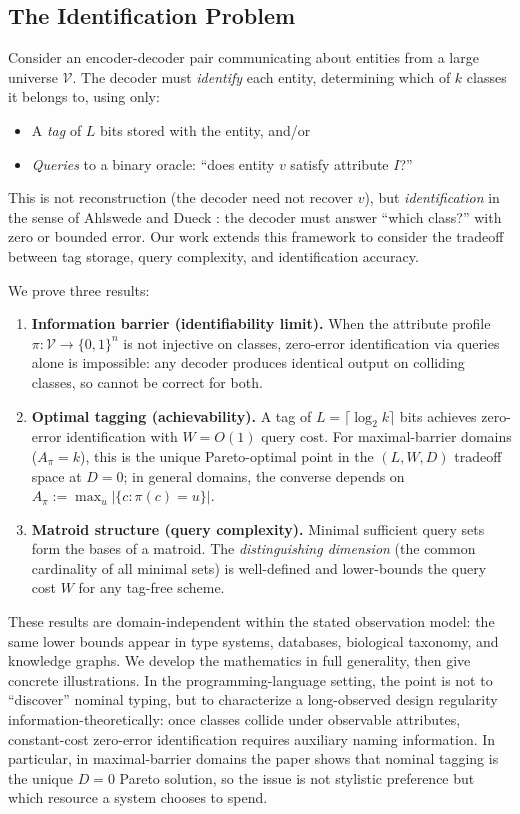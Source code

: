 \subsection{The Identification Problem}

Consider an encoder-decoder pair communicating about entities from a large universe $\mathcal{V}$. The decoder must \emph{identify} each entity, determining which of $k$ classes it belongs to, using only:
\begin{itemize}
\item A \emph{tag} of $L$ bits stored with the entity, and/or
\item \emph{Queries} to a binary oracle: ``does entity $v$ satisfy attribute $I$?''
\end{itemize}

This is not reconstruction (the decoder need not recover $v$), but \emph{identification} in the sense of Ahlswede and Dueck \cite{ahlswede1989identification}: the decoder must answer ``which class?'' with zero or bounded error. Our work extends this framework to consider the tradeoff between tag storage, query complexity, and identification accuracy.

We prove three results:
\begin{enumerate}
\item \textbf{Information barrier (identifiability limit).} When the attribute profile $\pi: \mathcal{V} \to \{0,1\}^n$ is not injective on classes, zero-error identification via queries alone is impossible: any decoder produces identical output on colliding classes, so cannot be correct for both.
\item \textbf{Optimal tagging (achievability).} A tag of $L = \lceil \log_2 k \rceil$ bits achieves zero-error identification with $W = O(1)$ query cost. For maximal-barrier domains ($A_\pi = k$), this is the unique Pareto-optimal point in the $(L, W, D)$ tradeoff space at $D=0$; in general domains, the converse depends on $A_\pi := \max_u |\{c : \pi(c)=u\}|$.
\item \textbf{Matroid structure (query complexity).} Minimal sufficient query sets form the bases of a matroid. The \emph{distinguishing dimension} (the common cardinality of all minimal sets) is well-defined and lower-bounds the query cost $W$ for any tag-free scheme.
\end{enumerate}

These results are domain-independent within the stated observation model: the same lower bounds appear in type systems, databases, biological taxonomy, and knowledge graphs. We develop the mathematics in full generality, then give concrete illustrations. In the programming-language setting, the point is not to ``discover'' nominal typing, but to characterize a long-observed design regularity information-theoretically: once classes collide under observable attributes, constant-cost zero-error identification requires auxiliary naming information. In particular, in maximal-barrier domains the paper shows that nominal tagging is the unique $D=0$ Pareto solution, so the issue is not stylistic preference but which resource a system chooses to spend.

